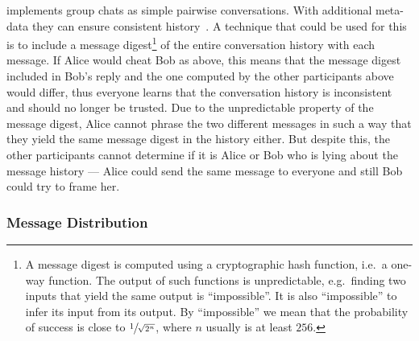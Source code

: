 \textcite{SignalApp} implements group chats as simple pairwise conversations.
With additional meta-data they can ensure consistent history~\cite{TSgroups}.
A technique that could be used for this is to include a message 
digest\footnote{%
  A message digest is computed using a cryptographic hash function, i.e.\ 
  a one-way function.
  The output of such functions is unpredictable, e.g.\ finding two inputs that 
  yield the same output is \enquote{impossible}.
  It is also \enquote{impossible} to infer its input from its output.
  By \enquote{impossible} we mean that the probability of success is close to 
  \(\sfrac{1}{\sqrt{2^n}}\), where \(n\) usually is at least \(256\).
} of the entire conversation history with each message.
If Alice would cheat Bob as above, this means that the message digest included 
in Bob's reply and the one computed by the other participants above would 
differ, thus everyone learns that the conversation history is inconsistent and 
should no longer be trusted.
Due to the unpredictable property of the message digest, Alice cannot phrase 
the two different messages in such a way that they yield the same message 
digest in the history either.
But despite this, the other participants cannot determine if it is Alice or Bob
who is lying about the message history --- Alice could send the same message to
everyone and still Bob could try to frame her.

\subsubsection{Message Distribution}
\label{MessageDistribution}



